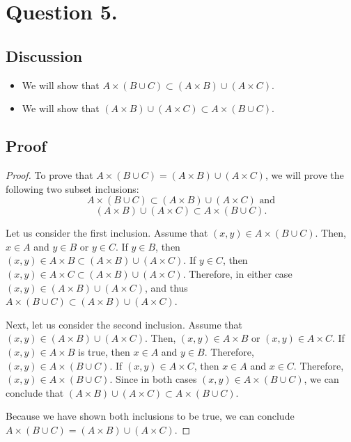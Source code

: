 \documentclass{article}
\begin{document}
\section*{Question 5.}
\subsection*{Discussion}
\begin{itemize}
    \item We will show that $ A \times (B \cup C) \subset (A \times B) \cup (A \times C) $.
    \item We will show that $ (A \times B) \cup (A \times C) \subset A \times (B \cup C) $.
\end{itemize}

\subsection*{Proof}
\begin{proof}
    To prove that $ A \times (B \cup C) = (A \times B) \cup (A \times C) $, we will prove the following two subset inclusions: 
    \[ A \times (B \cup C) \subset (A \times B) \cup (A \times C) \mbox{ and} \] 
    \[ (A \times B) \cup (A \times C) \subset A \times (B \cup C). \]

    \noindent Let us consider the first inclusion. Assume that $ (x, y) \in A \times (B \cup C) $. Then, $ x \in A $ and $ y \in B $ or $ y \in C $. If $ y \in B $, then $ (x, y) \in A \times B \subset (A \times B) \cup (A \times C) $. If $ y \in C $, then $ (x, y) \in A \times C \subset (A \times B) \cup (A \times C) $. Therefore, in either case $ (x, y) \in (A \times B) \cup (A \times C) $, and thus
    $ A \times (B \cup C) \subset (A \times B) \cup (A \times C) $.

    \noindent Next, let us consider the second inclusion. Assume that $ (x, y) \in (A \times B) \cup (A \times C) $. Then, $ (x, y) \in A \times B $ or $ (x, y) \in A \times C $. If $ (x, y) \in A \times B $ is true, then $ x \in A $ and $ y \in B $. Therefore, $ (x, y) \in A \times (B \cup C) $. If $ (x, y) \in A \times C $, then $ x \in A $ and $ x \in C $. Therefore, $ (x, y) \in A \times (B \cup C) $.
    Since in both cases $ (x, y) \in A \times (B \cup C) $, we can conclude that $ (A \times B) \cup (A \times C) \subset A \times (B \cup C) $.

    \noindent Because we have shown both inclusions to be true, we can conclude $ A \times (B \cup C) = (A \times B) \cup (A \times C) $.
\end{proof}
\end{document}
